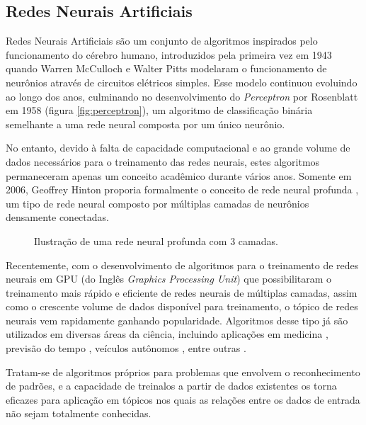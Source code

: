 \subsection{Redes Neurais Artificiais}
\label{sec:ann}

Redes Neurais Artificiais são um conjunto de algoritmos inspirados pelo funcionamento do cérebro humano, introduzidos pela primeira vez em 1943 quando Warren McCulloch e Walter Pitts modelaram o funcionamento de neurônios através de circuitos elétricos simples\cite{mccullochLogicalCalculusIdeas1943}. 
Esse modelo continuou evoluindo ao longo dos anos, culminando no desenvolvimento do \textit{Perceptron} por Rosenblatt em 1958 \cite{rosenblattPerceptronProbabilisticModel1958} (figura \ref{fig:perceptron}), um algoritmo de classificação binária semelhante a uma rede neural composta por um único neurônio.

No entanto, devido à falta de capacidade computacional e ao grande volume de dados necessários para o treinamento das redes neurais, estes algoritmos permaneceram apenas um conceito acadêmico durante vários anos.
Somente em 2006, Geoffrey Hinton proporia formalmente o conceito de rede neural profunda \cite{hintonFastLearningAlgorithm2006}, um tipo de rede neural composto por múltiplas camadas de neurônios densamente conectadas.

\begin{figure}[ht]
    \centering
    \resizebox{0.7\textwidth}{!}{
        
    }
    \caption{Ilustração de uma rede neural profunda com 3 camadas.}
    \label{fig:dnn}
\end{figure}

Recentemente, com o desenvolvimento de algoritmos para o treinamento de redes neurais em GPU (do Inglês \textit{Graphics Processing Unit}) que possibilitaram o treinamento mais rápido e eficiente de redes neurais de múltiplas camadas, assim como o crescente volume de dados disponível para treinamento, o tópico de redes neurais vem rapidamente ganhando popularidade.
Algoritmos desse tipo já são utilizados em diversas áreas da ciência, incluindo aplicações em medicina \cite{hannunCardiologistLevelArrhythmiaDetection2019,phamPredictingHealthcareTrajectories2017,houDeepSFDeepConvolutional2018}, previsão do tempo \cite{akramSequenceSequenceWeather2016}, veículos autônomos \cite{bojarskiEndEndLearning2016,peddagollaLaneDetectionAutonomous}, entre outras \cite{abiodunStateoftheartArtificialNeural2018}.

Tratam-se de algoritmos próprios para problemas que envolvem o reconhecimento de padrões, e a capacidade de treina\-los a partir de dados existentes os torna eficazes para aplicação em tópicos nos quais as relações entre os dados de entrada não sejam totalmente conhecidas.


